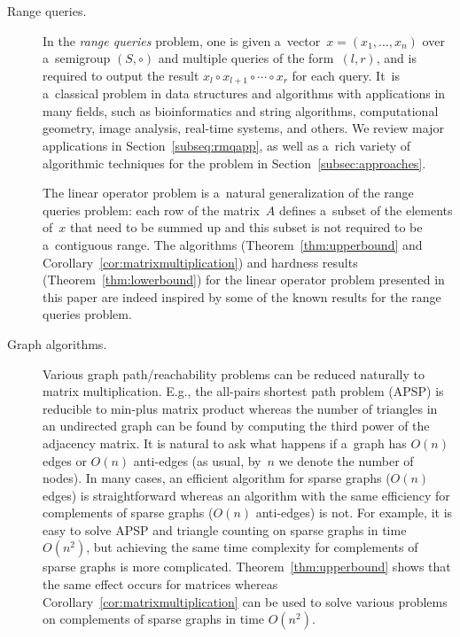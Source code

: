 \documentclass[11pt,letterpaper]{article}
\begin{document}
\begin{description}
\item[Range queries.] In the \emph{range queries} problem,
one is given a~vector~$x=(x_1, \dotsc, x_n)$ over a~semigroup $(S, \circ)$ and
multiple queries of the form~$(l,r)$, and is required to
output the result $x_l \circ x_{l+1} \circ \dotsb \circ x_r$
for each query. It~is a~classical problem in data structures and
algorithms with applications in many fields, such as bioinformatics and
string algorithms, computational geometry, image analysis, real-time
systems, and others. We review major applications in Section~\ref{subseq:rmqapp},
as well as a~rich variety of algorithmic techniques for the problem in
Section~\ref{subsec:approaches}.

The linear operator problem is a~natural generalization of the range queries
problem: each row of the matrix~$A$ defines a~subset of the elements of~$x$
that need to be summed up and this subset is not required to be
a~contiguous range. The algorithms (Theorem~\ref{thm:upperbound} and
Corollary~\ref{cor:matrixmultiplication}) and hardness results
(Theorem~\ref{thm:lowerbound}) for the linear operator problem presented in this
paper are indeed inspired by some of the known results for the range queries
problem.

\item[Graph algorithms.] Various graph path/reachability
problems can be reduced naturally to matrix multiplication.
E.g., the all-pairs shortest path problem (APSP) is reducible
to min-plus matrix product whereas the number of triangles in an
undirected graph can be found by computing the third power of the
adjacency matrix.
It is natural to ask what happens if
a~graph has $O(n)$ edges or $O(n)$ anti-edges
(as usual, by~$n$ we denote the number of nodes).
In many cases, an efficient algorithm
for sparse graphs ($O(n)$ edges) is straightforward
whereas an algorithm with the same efficiency
for complements of sparse graphs ($O(n)$ anti-edges) is not. For
example, it is easy to solve APSP and triangle counting on sparse graphs in
time $O(n^2)$, but achieving the same time complexity for complements of sparse
graphs is more complicated.
Theorem~\ref{thm:upperbound} shows that the same effect
occurs for matrices whereas
Corollary~\ref{cor:matrixmultiplication} can be used to
solve various problems on complements of
sparse graphs in time $O(n^2)$.


\end{description}
\end{document}
